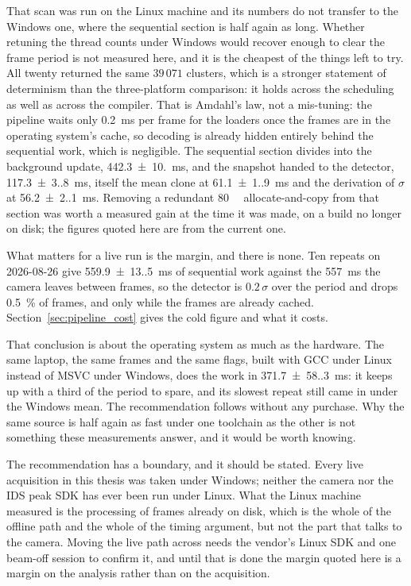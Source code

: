 \documentclass[a4paper,headsepline,oneside,11pt]{scrartcl}
\begin{document}
That scan was run on the Linux machine and its numbers do not transfer to the
Windows one, where the sequential section is half again as long. Whether
retuning the thread counts under Windows would recover enough to clear the frame
period is not measured here, and it is the cheapest of the things left to try. All twenty returned the same $39\,071$
clusters, which is a stronger statement of determinism than the three-platform
comparison: it holds across the scheduling as well as across the compiler. That is Amdahl's law, not a
mis-tuning: the pipeline waits only \SI{0.2}{\milli\second} per frame for the loaders once the
frames are in the operating system's cache, so decoding is already hidden
entirely behind the sequential work, which is
negligible. The sequential section divides into the background update, \SI{442.3(10.0)}{\milli\second}, and the snapshot handed to the detector, \SI{117.3(3.8)}{\milli\second}, itself the
mean clone at \SI{61.1(1.9)}{\milli\second} and the derivation of $\sigma$ at \SI{56.2(2.1)}{\milli\second}. Removing a redundant \SI{80}{\mega\byte} allocate-and-copy from that section was worth
a measured gain at the time it was made, on a build no longer on disk; the
figures quoted here are from the current one.

What matters for a live run is the margin, and there is none. Ten repeats on
2026-08-26 give \SI{559.9(13.5)}{\milli\second} of sequential work against the
\SI{557}{\milli\second} the camera leaves between frames, so the detector is
$0.2\,\sigma$ over the period and drops \SI{0.5}{\percent} of frames, and only while the
frames are already cached. Section~\ref{sec:pipeline_cost} gives the cold
figure and what it costs.

That conclusion is about the operating system as much as the hardware. The same
laptop, the same frames and the same flags, built with GCC under Linux instead
of MSVC under Windows, does the work in \SI{371.7(58.3)}{\milli\second}: it
keeps up with a third of the period to spare, and its slowest repeat still came
in under the Windows mean. The recommendation follows without any purchase.
Why the same source is half again as fast under one toolchain as the other is
not something these measurements answer, and it would be worth knowing.

The recommendation has a boundary, and it should be stated. Every live
acquisition in this thesis was taken under Windows; neither the camera nor the
IDS peak SDK has ever been run under Linux. What the Linux machine measured is
the processing of frames already on disk, which is the whole of the offline path
and the whole of the timing argument, but not the part that talks to the camera.
Moving the live path across needs the vendor's Linux SDK and one beam-off
session to confirm it, and until that is done the margin quoted here is a margin
on the analysis rather than on the acquisition.
\end{document}
